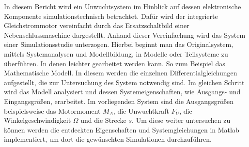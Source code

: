 
\label{Einleitung}
In diesem Bericht wird ein Unwuchtsystem im Hinblick auf dessen elektronische Komponente simulationstechnisch betrachtet. Dafür wird der integrierte Gleichstrommotor vereinfacht durch das Ersatzschaltbild einer Nebenschlussmaschine dargestellt. Anhand dieser Vereinfachung wird das System einer Simulationsstudie unterzogen. Hierbei beginnt man das Originalsystem, mittels Systemanalysen und Modellbildung, in Modelle oder Teilsysteme zu überführen. In denen leichter gearbeitet werden kann. So zum Beispiel das Mathematische Modell. In diesem werden die einzelnen Differentialgleichungen aufgestellt, die zur Untersuchung des System notwendig sind. Im gleichen Schritt wird das Modell analysiert und dessen Systemeigenschaften, wie Ausgangs- und Eingangsgrößen, erarbeitet. Im vorliegenden System sind die Ausgangsgrößen beispielsweise das Motormoment $M_A$, die Unwuchtkraft $F_U$, die Winkelgeschwindigkeit $\Omega$ und die Strecke $s$. Um diese weiter untersuchen zu können werden die entdeckten Eigenschaften und Systemgleichungen in Matlab implementiert, um dort die gewünschten Simulationen durchzuführen. 